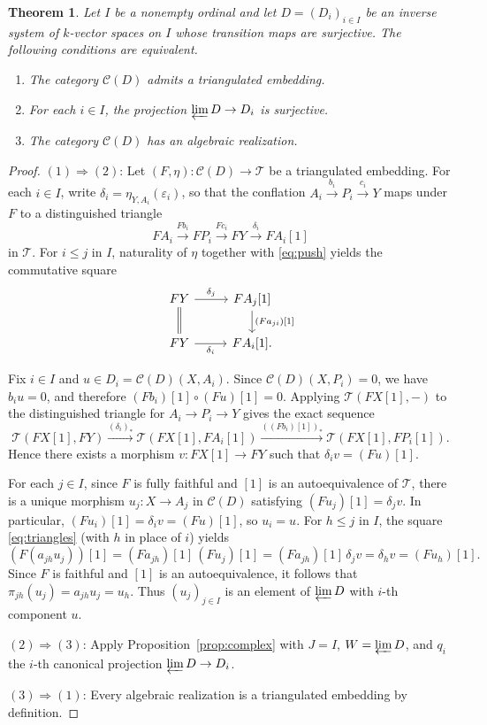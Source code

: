 \documentclass[a4paper,reqno,10pt]{amsart}
\numberwithin{equation}{section}
\newtheorem{theorem}{Theorem}[section]
\theoremstyle{definition}
\newcommand{\C}{\mathcal C}
\newcommand{\T}{\mathcal T}
\begin{document}
\begin{theorem}\label{thm:criterion}
Let $I$ be a nonempty ordinal and let $D=(D_i)_{i\in I}$ be an inverse system
of $k$-vector spaces on $I$ whose transition maps are surjective. The following
conditions are equivalent.
\begin{enumerate}
\item The category $\C(D)$ admits a triangulated embedding.
\item For each $i\in I$, the projection $\varprojlim D\to D_i$ is surjective.
\item The category $\C(D)$ has an algebraic realization.
\end{enumerate}
\end{theorem}
\begin{proof}
$(1)\Rightarrow(2)$:
Let $(F,\eta):\C(D)\to\T$ be a triangulated embedding. For each $i\in I$, write
$\delta_i=\eta_{Y,A_i}(\varepsilon_i)$, so that the conflation
$A_i\xrightarrow{b_i}P_i\xrightarrow{c_i}Y$ maps under $F$ to a distinguished
triangle
\[
  FA_i\xrightarrow{Fb_i}FP_i\xrightarrow{Fc_i}FY\xrightarrow{\delta_i}FA_i[1]
\]
in $\T$. For $i\le j$ in $I$, naturality of $\eta$ together with
\eqref{eq:push} yields the commutative square
\begin{equation}\label{eq:triangles}
\begin{tikzcd}[column sep=2.6em]
 FY\ar[r,"\delta_j"]\ar[d,equal]&FA_j[1]\ar[d,"{(F a_{ji})[1]}"]\\
 FY\ar[r,"\delta_i"']&FA_i[1].
\end{tikzcd}
\end{equation}

Fix $i\in I$ and $u\in D_i=\C(D)(X,A_i)$. Since $\C(D)(X,P_i)=0$, we have
$b_i u=0$, and therefore $(Fb_i)[1]\circ(Fu)[1]=0$. Applying $\T(FX[1],-)$ to
the distinguished triangle for $A_i\to P_i\to Y$ gives the exact sequence
\[
 \T(FX[1],FY)\xrightarrow{(\delta_i)_*}\T(FX[1],FA_i[1])
       \xrightarrow{((F b_i)[1])_*}\T(FX[1],FP_i[1]).
\]
Hence there exists a morphism $v:FX[1]\to FY$ such that $\delta_i v=(Fu)[1]$.

For each $j\in I$, since $F$ is fully faithful and $[1]$ is an autoequivalence
of $\T$, there is a unique morphism $u_j:X\to A_j$ in $\C(D)$ satisfying
$(F u_j)[1]=\delta_j v$. In particular, $(Fu_i)[1]=\delta_i v=(Fu)[1]$, so
$u_i=u$. For $h\le j$ in $I$, the square \eqref{eq:triangles} (with $h$ in place
of $i$) yields
\[
    (F(a_{jh}u_j))[1]=(F a_{jh})[1]\,(F u_j)[1]
                     =(F a_{jh})[1]\,\delta_j v
                     =\delta_h v=(F u_h)[1].
\]
Since $F$ is faithful and $[1]$ is an autoequivalence, it follows that
$\pi_{jh}(u_j)=a_{jh}u_j=u_h$. Thus $(u_j)_{j\in I}$ is an element of
$\varprojlim D$ with $i$-th component $u$.

\medskip\noindent
$(2)\Rightarrow(3)$:
Apply Proposition~\ref{prop:complex} with $J=I$, $W=\varprojlim D$, and $q_i$
the $i$-th canonical projection $\varprojlim D\to D_i$.

\medskip\noindent
$(3)\Rightarrow(1)$:
Every algebraic realization is a triangulated embedding by definition.
\end{proof}
\end{document}
